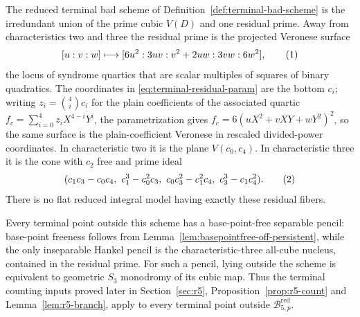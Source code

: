 \begin{proposition}\label{prop:reduced-terminal-carrier}%
%
%
The reduced terminal bad scheme of
Definition~\ref{def:terminal-bad-scheme} is the irredundant union of the prime
cubic \(V(D)\) and one residual prime.  Away from characteristics two and
three the residual prime is the projected Veronese surface
\[
 [u:v:w]\longmapsto [6u^2:3uv:v^2+2uw:3vw:6w^2],
 \autoeqtag{eq:terminal-residual-param}
\]
the locus of syndrome quartics that are scalar multiples of squares of binary
quadratics.  The coordinates in \eqref{eq:terminal-residual-param} are the
bottom \(c_i\); writing \(z_i=\binom4ic_i\) for the plain coefficients of the
associated quartic \(f_c=\sum_{i=0}^4z_iX^{4-i}Y^i\), the parametrization gives
\(f_c=6(uX^2+vXY+wY^2)^2\), so the same surface is the
plain-coefficient Veronese in rescaled divided-power coordinates.
In characteristic two it is the plane \(V(c_0,c_4)\).  In
characteristic three it is the cone with \(c_2\) free and prime ideal
\[
 (c_1c_3-c_0c_4,\ c_1^3-c_0^2c_3,\
   c_0c_3^2-c_1^2c_4,\ c_3^3-c_1c_4^2).
 \autoeqtag{eq:terminal-char3-prime}
\]
There is no flat reduced integral model having exactly these residual
fibers.

Every terminal point outside this scheme has a base-point-free separable
pencil: base-point freeness follows from
Lemma~\ref{lem:basepointfree-off-persistent}, while the only inseparable
Hankel pencil is the characteristic-three all-cube nucleus, contained in the
residual prime.  For such a pencil, lying outside the scheme is equivalent to
geometric \(S_3\) monodromy of its cubic map.  Thus the terminal counting
inputs proved later in Section~\ref{sec:r5},
Proposition~\ref{prop:r5-count} and Lemma~\ref{lem:r5-branch}, apply to every
terminal point outside \(\mathcal B_{5,p}^{\mathrm{red}}\).
\end{proposition}

